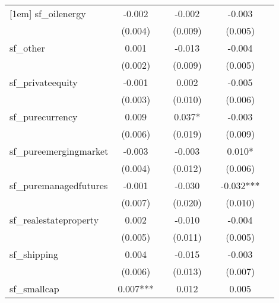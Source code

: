 {\begin{tabular}{l*{6}{c}}
[1em]
sf\_oilenergy&      -0.002   &               &      -0.002   &               &      -0.003   &               \\
            &     (0.004)   &               &     (0.009)   &               &     (0.005)   &               \\
[1em]
sf\_other    &       0.001   &               &      -0.013   &               &      -0.004   &               \\
            &     (0.002)   &               &     (0.009)   &               &     (0.005)   &               \\
[1em]
sf\_privateequity&      -0.001   &               &       0.002   &               &      -0.005   &               \\
            &     (0.003)   &               &     (0.010)   &               &     (0.006)   &               \\
[1em]
sf\_purecurrency&       0.009   &               &       0.037*  &               &      -0.003   &               \\
            &     (0.006)   &               &     (0.019)   &               &     (0.009)   &               \\
[1em]
sf\_pureemergingmarket&      -0.003   &               &      -0.003   &               &       0.010*  &               \\
            &     (0.004)   &               &     (0.012)   &               &     (0.006)   &               \\
[1em]
sf\_puremanagedfutures&      -0.001   &               &      -0.030   &               &      -0.032***&               \\
            &     (0.007)   &               &     (0.020)   &               &     (0.010)   &               \\
[1em]
sf\_realestateproperty&       0.002   &               &      -0.010   &               &      -0.004   &               \\
            &     (0.005)   &               &     (0.011)   &               &     (0.005)   &               \\
[1em]
sf\_shipping &       0.004   &               &      -0.015   &               &      -0.003   &               \\
            &     (0.006)   &               &     (0.013)   &               &     (0.007)   &               \\
[1em]
sf\_smallcap &       0.007***&               &       0.012   &               &       0.005   &               \\

\end{tabular}}
